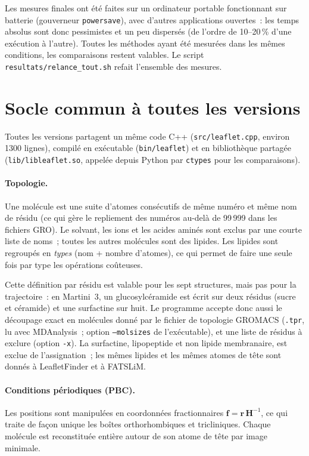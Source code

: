 \documentclass[11pt,a4paper]{article}
\begin{document}
Les mesures finales ont été faites sur un ordinateur portable fonctionnant sur batterie (gouverneur
\texttt{powersave}), avec d'autres applications ouvertes~: les temps absolus sont donc pessimistes et un peu
dispersés (de l'ordre de 10--20\,\% d'une exécution à l'autre). Toutes les méthodes ayant été mesurées dans les
mêmes conditions, les comparaisons restent valables. Le script \texttt{resultats/relance\_tout.sh} refait
l'ensemble des mesures.

\section{Socle commun à toutes les versions}
Toutes les versions partagent un même code C++ (\texttt{src/leaflet.cpp}, environ 1300 lignes), compilé en
exécutable (\texttt{bin/leaflet}) et en bibliothèque partagée (\texttt{lib/libleaflet.so}, appelée depuis Python
par \texttt{ctypes} pour les comparaisons).

\paragraph{Topologie.} Une molécule est une suite d'atomes consécutifs de même numéro et même nom de résidu (ce
qui gère le repliement des numéros au-delà de 99\,999 dans les fichiers GRO). Le solvant, les ions et les acides
aminés sont exclus par une courte liste de noms~; toutes les autres molécules sont des lipides. Les lipides sont
regroupés en \emph{types} (nom + nombre d'atomes), ce qui permet de faire une seule fois par type les opérations
coûteuses.

Cette définition par résidu est valable pour les sept structures, mais pas pour la trajectoire~: en Martini~3, un
glucosylcéramide est écrit sur deux résidus (sucre et céramide) et une surfactine sur huit. Le programme accepte donc
aussi le découpage exact en molécules donné par le fichier de topologie GROMACS (\texttt{.tpr}, lu avec MDAnalysis~;
option \texttt{--molsizes} de l'exécutable), et une liste de résidus à exclure (option \texttt{-x}). La surfactine,
lipopeptide et non lipide membranaire, est exclue de l'assignation~; les mêmes lipides et les mêmes atomes de tête
sont donnés à LeafletFinder et à FATSLiM.

\paragraph{Conditions périodiques (PBC).} Les positions sont manipulées en coordonnées fractionnaires
$\mathbf f=\mathbf r\,\mathbf H^{-1}$, ce qui traite de façon unique les boîtes orthorhombiques et tricliniques.
Chaque molécule est reconstituée entière autour de son atome de tête par image minimale.
\end{document}
